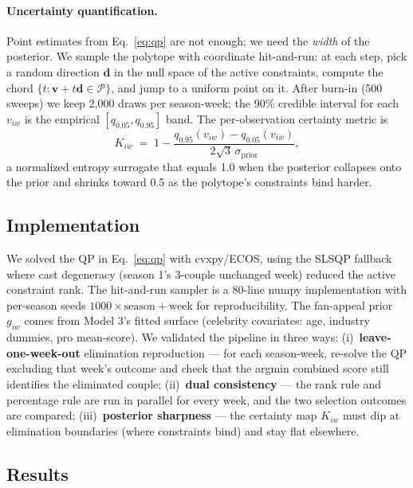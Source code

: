 \documentclass[11pt]{article}
\begin{document}
\paragraph{Uncertainty quantification.} Point estimates from Eq.~\eqref{eq:qp} are not enough;
we need the \emph{width} of the posterior. We sample the polytope with coordinate hit-and-run:
at each step, pick a random direction $\mathbf{d}$ in the null space of the active constraints,
compute the chord $\{t : \mathbf{v} + t\mathbf{d} \in \mathcal{P}\}$, and jump to a uniform point
on it. After burn-in (500 sweeps) we keep 2,000 draws per season-week; the 90\% credible
interval for each $v_{iw}$ is the empirical $[q_{0.05}, q_{0.95}]$ band. The per-observation
certainty metric is
\begin{equation}
K_{iw} \;=\; 1 - \frac{q_{0.95}(v_{iw}) - q_{0.05}(v_{iw})}{2\sqrt{3}\,\sigma_\text{prior}},
\label{eq:certainty}
\end{equation}
a normalized entropy surrogate that equals 1.0 when the posterior collapses onto the prior and
shrinks toward 0.5 as the polytope's constraints bind harder.

\subsection{Implementation}

We solved the QP in Eq.~\eqref{eq:qp} with cvxpy/ECOS, using the SLSQP fallback where cast
degeneracy (season 1's 3-couple unchanged week) reduced the active constraint rank. The
hit-and-run sampler is a 80-line numpy implementation with per-season seeds
$1000 \times \text{season} + \text{week}$ for reproducibility. The fan-appeal prior $g_{iw}$
comes from Model 3's fitted surface (celebrity covariates: age, industry dummies, pro
mean-score). We validated the pipeline in three ways:
(i)~\textbf{leave-one-week-out} elimination reproduction --- for each season-week, re-solve the
QP excluding that week's outcome and check that the argmin combined score still identifies the
eliminated couple;
(ii)~\textbf{dual consistency} --- the rank rule and percentage rule are run in parallel for
every week, and the two selection outcomes are compared;
(iii)~\textbf{posterior sharpness} --- the certainty map $K_{iw}$ must dip at elimination
boundaries (where constraints bind) and stay flat elsewhere.

\subsection{Results}
\end{document}
